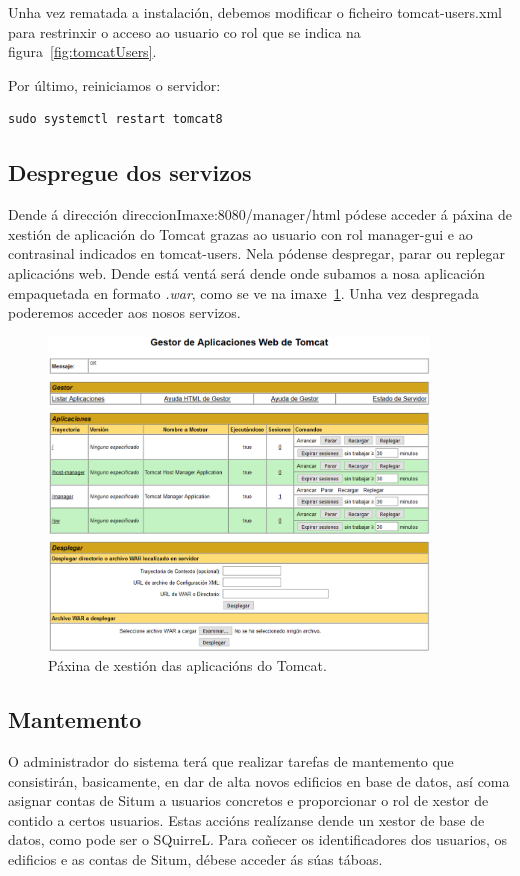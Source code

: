 Unha vez rematada a instalación, debemos modificar o ficheiro tomcat-users.xml para restrinxir o acceso ao usuario co rol que se indica na figura~\ref{fig:tomcatUsers}.

Por último, reiniciamos o servidor:

\begin{lstlisting}
sudo systemctl restart tomcat8
\end{lstlisting}

\subsection{Despregue dos servizos}
Dende á dirección direccionImaxe:8080/manager/html pódese acceder á páxina de xestión de aplicación do Tomcat grazas ao usuario con rol manager-gui e ao contrasinal indicados en tomcat-users. Nela pódense despregar, parar ou replegar aplicacións web. Dende está ventá será dende onde subamos a nosa aplicación empaquetada en formato \emph{.war}, como se ve na imaxe~\ref{fig:tomcatXestor}. Unha vez despregada poderemos acceder aos nosos servizos.

\begin{figure}[h]
	\begin{center}
		\includegraphics[width=0.9\textwidth]{figures/capturas/tomcatXestor}
		\caption{Páxina de xestión das aplicacións do Tomcat.}
		\label{fig:tomcatXestor}
	\end{center}
\end{figure}


\subsection{Mantemento}
O administrador do sistema terá que realizar tarefas de mantemento que consistirán, basicamente, en dar de alta novos edificios en base de datos, así coma asignar contas de Situm a usuarios concretos e proporcionar o rol de xestor de contido a certos usuarios. Estas accións realízanse dende un xestor de base de datos, como pode ser o SQuirreL. Para coñecer os identificadores dos usuarios, os edificios e as contas de Situm, débese acceder ás súas táboas.

